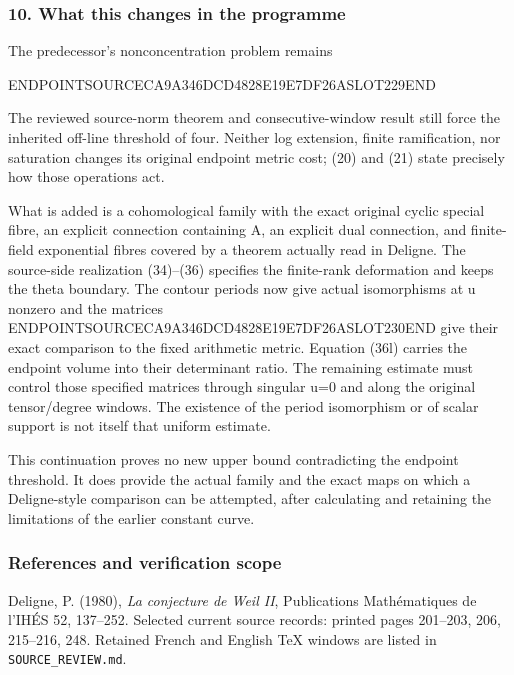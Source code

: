 \subsubsection{10. What this changes in the programme}\label{endpoint-exponential_original--what-this-changes-in-the-programme}

The predecessor's nonconcentration problem remains

ENDPOINTSOURCECA9A346DCD4828E19E7DF26ASLOT229END

The reviewed source-norm theorem and consecutive-window result still force the inherited off-line threshold of four. Neither log extension, finite ramification, nor saturation changes its original endpoint metric cost; (20) and (21) state precisely how those operations act.

What is added is a cohomological family with the exact original cyclic special fibre, an explicit connection containing A, an explicit dual connection, and finite-field exponential fibres covered by a theorem actually read in Deligne. The source-side realization (34)--(36) specifies the finite-rank deformation and keeps the theta boundary. The contour periods now give actual isomorphisms at u nonzero and the matrices ENDPOINTSOURCECA9A346DCD4828E19E7DF26ASLOT230END give their exact comparison to the fixed arithmetic metric. Equation (36l) carries the endpoint volume into their determinant ratio. The remaining estimate must control those specified matrices through singular u=0 and along the original tensor/degree windows. The existence of the period isomorphism or of scalar support is not itself that uniform estimate.

This continuation proves no new upper bound contradicting the endpoint threshold. It does provide the actual family and the exact maps on which a Deligne-style comparison can be attempted, after calculating and retaining the limitations of the earlier constant curve.

\subsubsection{References and verification scope}\label{endpoint-exponential_original--references-and-verification-scope}

Deligne, P. (1980), \emph{La conjecture de Weil II}, Publications Mathématiques de l'IHÉS 52, 137--252. Selected current source records: printed pages 201--203, 206, 215--216, 248. Retained French and English TeX windows are listed in \texttt{SOURCE\_REVIEW.md}.

